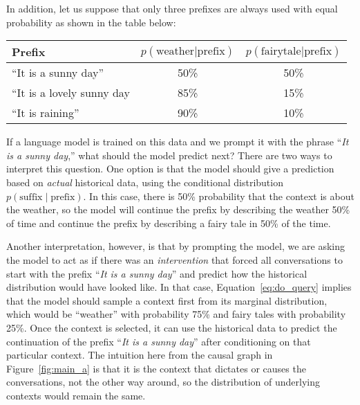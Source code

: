 In addition, let us suppose that only three prefixes are always used with equal probability as shown in the table below:
\begin{table}[H]
    \centering
    \begin{tabular}{l|c|c}
         \bf Prefix & $p(\mathrm{weather} | \mathrm{prefix})$ & $p(\mathrm{fairy tale} | \mathrm{prefix})$  \\ \hline
         ``It is a sunny day'' &  50\% & 50\% \\
         ``It is a lovely sunny day & 85\% & 15\%\\
         ``It is raining'' & 90\% & 10\%
    \end{tabular}
\end{table}

If a language model is trained on this data and we prompt it with the phrase ``\emph{It is a sunny day},'' what should the model predict next? There are two ways to interpret this question. One option is that the model should give a prediction based on \emph{actual} historical data, using the conditional distribution $p\left(\mathrm{suffix}\;|\;\mathrm{prefix}\right)$. In this case, there is 50\% probability that the context is about the weather, so the model will continue the prefix by describing the weather 50\% of time and continue the prefix by describing a fairy tale in 50\% of the time.

Another interpretation, however, is that by prompting the model, we are asking the model to act as if there was an \emph{intervention} that forced all conversations to start with the prefix ``\emph{It is a sunny day}'' and  predict how the historical distribution would have looked like. In that case, Equation~\ref{eq:do_query} implies that the model should sample a context first from its marginal distribution, which would be ``weather'' with probability 75\% and fairy tales with probability 25\%. Once the context is selected, it can use the historical data to predict the continuation of the prefix ``\emph{It is a sunny day}'' after conditioning on that particular context. The intuition here from the causal graph in Figure~\ref{fig:main_a} is that it is the context that dictates or causes the conversations, not the other way around, so the distribution of underlying contexts would remain the same.

\newpage
